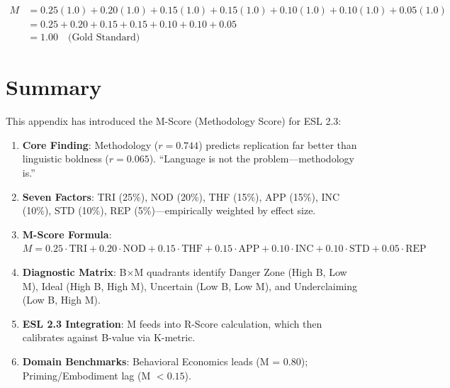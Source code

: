 \documentclass[11pt,a4paper]{article}
\begin{document}
\begin{align*}
M &= 0.25(1.0) + 0.20(1.0) + 0.15(1.0) + 0.15(1.0) + 0.10(1.0) + 0.10(1.0) + 0.05(1.0) \\
  &= 0.25 + 0.20 + 0.15 + 0.15 + 0.10 + 0.10 + 0.05 \\
  &= 1.00 \quad \text{(Gold Standard)}
\end{align*}


\section{Summary}
\label{sec:summary}

This appendix has introduced the M-Score (Methodology Score) for ESL 2.3:

\begin{enumerate}
    \item \textbf{Core Finding}: Methodology ($r = 0.744$) predicts replication far better than linguistic boldness ($r = 0.065$). ``Language is not the problem---methodology is.''

    \item \textbf{Seven Factors}: TRI (25\%), NOD (20\%), THF (15\%), APP (15\%), INC (10\%), STD (10\%), REP (5\%)---empirically weighted by effect size.

    \item \textbf{M-Score Formula}: $M = 0.25 \cdot \text{TRI} + 0.20 \cdot \text{NOD} + 0.15 \cdot \text{THF} + 0.15 \cdot \text{APP} + 0.10 \cdot \text{INC} + 0.10 \cdot \text{STD} + 0.05 \cdot \text{REP}$

    \item \textbf{Diagnostic Matrix}: B$\times$M quadrants identify Danger Zone (High B, Low M), Ideal (High B, High M), Uncertain (Low B, Low M), and Underclaiming (Low B, High M).

    \item \textbf{ESL 2.3 Integration}: M feeds into R-Score calculation, which then calibrates against B-value via K-metric.

    \item \textbf{Domain Benchmarks}: Behavioral Economics leads (M = 0.80); Priming/Embodiment lag (M $< 0.15$).
\end{enumerate}
\end{document}
